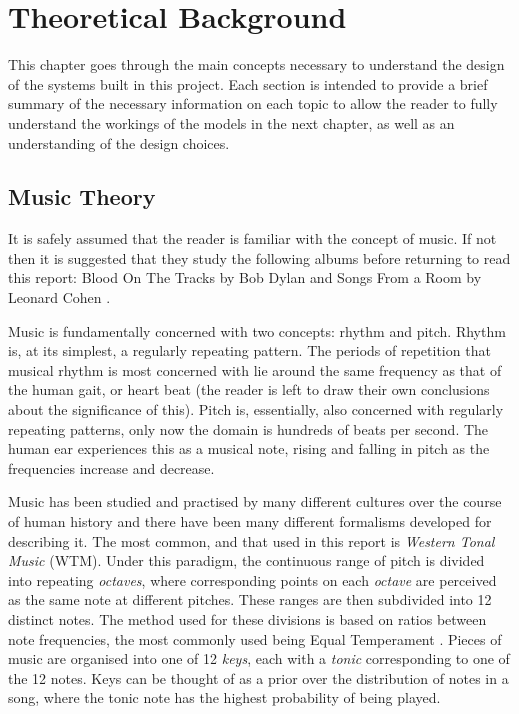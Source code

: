 \documentclass[bsc,singlespacing,logo, parskip, deptreport]{infthesis}
\begin{document}
\chapter{Theoretical Background}
This chapter goes through the main concepts necessary to understand the design of the systems built in this project. Each section is intended to provide a brief summary of the necessary information on each topic to allow the reader to fully understand the workings of the models in the next chapter, as well as an understanding of the design choices.

\section{Music Theory}
It is safely assumed that the reader is familiar with the concept of music. If not then it is suggested that they study the following albums before returning to read this report: Blood On The Tracks by Bob Dylan \cite{dylan1975blood} and Songs From a Room by Leonard Cohen \cite{cohen2007songs}.

Music is fundamentally concerned with two concepts: rhythm and pitch. Rhythm is, at its simplest, a regularly repeating pattern. The periods of repetition that musical rhythm is most concerned with lie around the same frequency as that of the human gait, or heart beat (the reader is left to draw their own conclusions about the significance of this). Pitch is, essentially, also concerned with regularly repeating patterns, only now the domain is hundreds of beats per second. The human ear experiences this as a musical note, rising and falling in pitch as the frequencies increase and decrease.

Music has been studied and practised by many different cultures over the course of human history and there have been many different formalisms developed for describing it. The most common, and that used in this report is {\em Western Tonal Music} (WTM). Under this paradigm, the continuous range of pitch is divided into repeating {\em octaves}, where corresponding points on each {\em octave} are perceived as the same note at different pitches. These ranges are then subdivided into 12 distinct notes. The method used for these divisions is based on ratios between note frequencies, the most commonly used being Equal Temperament \cite{regener1973pitch}. Pieces of music are organised into one of 12 {\em keys}, each with a {\em tonic} corresponding to one of the 12 notes. Keys can be thought of as a prior over the distribution of notes in a song, where the tonic note has the highest probability of being played.
\end{document}
